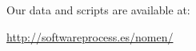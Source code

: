 \documentclass[]{sig-alternate}
\begin{document}



\appendix

Our data and scripts are available at:

 \url{http://softwareprocess.es/nomen/}


%

\end{document}
